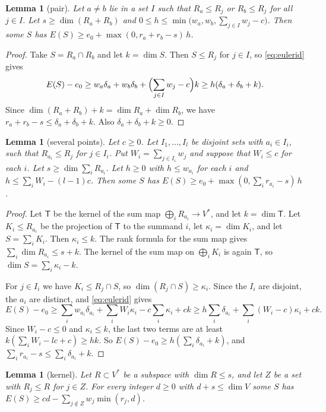 \documentclass[11pt]{amsart}
\newtheorem{lemma}[theorem]{Lemma}
\theoremstyle{definition}
\theoremstyle{remark}
\numberwithin{equation}{section}
\begin{document}
\begin{lemma}[pair]\label{lem:pairU}
Let $a\ne b$ lie in a set $I$ such that $R_a\le R_j$ or $R_b\le R_j$ for all $j\in I$. Let
$s\ge\dim(R_a+R_b)$ and $0\le h\le\min\bigl(w_a,w_b,\sum_{j\in I}w_j-c\bigr)$. Then some $S$ has
$E(S)\ge e_0+\max(0,r_a+r_b-s)\,h$.
\end{lemma}

\begin{proof}
Take $S=R_a\cap R_b$ and let $k=\dim S$. Then $S\le R_j$ for $j\in I$, so \eqref{eq:eulerid} gives
\[
 E(S)-e_0\ge w_a\delta_a+w_b\delta_b+\Bigl(\sum_{j\in I}w_j-c\Bigr)k\ge h(\delta_a+\delta_b+k).
\]
Since $\dim(R_a+R_b)+k=\dim R_a+\dim R_b$, we have $r_a+r_b-s\le\delta_a+\delta_b+k$. Also $\delta_a+\delta_b+k\ge0$.
\end{proof}

\begin{lemma}[several points]\label{lem:pointsU}
Let $c\ge0$. Let $I_1,\ldots,I_l$ be disjoint sets with $a_i\in I_i$, such that $R_{a_i}\le R_j$ for $j\in I_i$. Put $W_i=\sum_{j\in I_i}w_j$ and suppose that $W_i\le c$ for each $i$.
Let $s\ge\dim\sum_iR_{a_i}$. Let $h\ge0$ with $h\le w_{a_i}$ for each $i$ and $h\le\sum_iW_i-(l-1)c$. Then some $S$ has
$E(S)\ge e_0+\max(0,\sum_ir_{a_i}-s)\,h$.
\end{lemma}

\begin{proof}
Let $\mathsf T$ be the kernel of the sum map $\bigoplus_iR_{a_i}\to V^*$, and let $k=\dim\mathsf T$. Let $K_i\le R_{a_i}$ be the projection of $\mathsf T$ to the summand $i$, let $\kappa_i=\dim K_i$, and let
$S=\sum_iK_i$. Then $\kappa_i\le k$. The rank formula for the sum map gives $\sum_i\dim R_{a_i}\le s+k$. The kernel of the sum map on $\bigoplus_iK_i$ is again $\mathsf T$, so
$\dim S=\sum_i\kappa_i-k$.

For $j\in I_i$ we have $K_i\le R_j\cap S$, so $\dim(R_j\cap S)\ge\kappa_i$. Since the $I_i$ are disjoint, the $a_i$ are distinct, and \eqref{eq:eulerid} gives
\[
 E(S)-e_0\ge\sum_iw_{a_i}\delta_{a_i}+\sum_iW_i\kappa_i-c\sum_i\kappa_i+ck\ge h\sum_i\delta_{a_i}+\sum_i(W_i-c)\kappa_i+ck.
\]
Since $W_i-c\le0$ and $\kappa_i\le k$, the last two terms are at least $k(\sum_iW_i-lc+c)\ge hk$. So $E(S)-e_0\ge h(\sum_i\delta_{a_i}+k)$, and
$\sum_ir_{a_i}-s\le\sum_i\delta_{a_i}+k$.
\end{proof}

\begin{lemma}[kernel]\label{lem:kernelU}
Let $R\subset V^*$ be a subspace with $\dim R\le s$, and let $Z$ be a set with $R_j\le R$ for $j\in Z$. For every integer $d\ge0$
with $d+s\le\dim V$ some $S$ has
$E(S)\ge cd-\sum_{j\notin Z}w_j\min(r_j,d)$.
\end{lemma}
\end{document}
